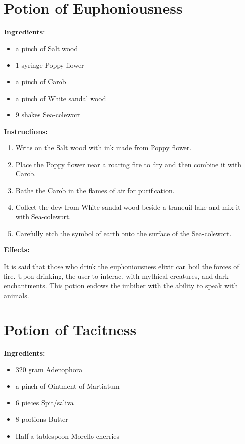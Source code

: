 \documentclass{article}
\begin{document}
\newpage
\section*{Potion of Euphoniousness}

\textbf{Ingredients:}

\begin{itemize}
  \item a pinch of Salt wood
  \item 1 syringe Poppy flower
  \item a pinch of Carob
  \item a pinch of White sandal wood
  \item 9 shakes Sea-colewort
\end{itemize}

\textbf{Instructions:}

\begin{enumerate}
  \item Write on the Salt wood with ink made from Poppy flower.
  \item Place the Poppy flower near a roaring fire to dry and then combine it with Carob.
  \item Bathe the Carob in the flames of air for purification.
  \item Collect the dew from White sandal wood beside a tranquil lake and mix it with Sea-colewort.
  \item Carefully etch the symbol of earth onto the surface of the Sea-colewort.
\end{enumerate}

\textbf{Effects:}

It is said that those who drink the euphoniousness elixir can boil the forces of fire. Upon drinking, the user to interact with mythical creatures, and dark enchantments. This potion endows the imbiber with the ability to speak with animals.

\newpage
\section*{Potion of Tacitness}

\textbf{Ingredients:}

\begin{itemize}
  \item 320 gram Adenophora
  \item a pinch of Ointment of Martiatum
  \item 6 pieces Spit/saliva
  \item 8 portions Butter
  \item Half a tablespoon Morello cherries
\end{itemize}
\end{document}
